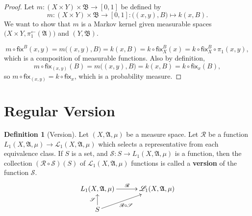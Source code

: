 \documentclass[
twoside=true,
paper=letter,
fontsize=11pt,
pagesize=auto,
leqno,
openany,
headsepline,
overfullrule,
]{scrbook}
\theoremstyle{plain}
\theoremstyle{plain}
\theoremstyle{definition}
\theoremstyle{bfnoteitalic}
\theoremstyle{bfnoteroman}
\newtheorem{defnboldnote}[thm]{Definition}
\newcommand{\term}[1]{\textbf{#1}\index{#1}}
\newcommand{\sigalg}[1]{\mathfrak{#1}}
\newcommand{\cali}[1]{\mathscr{#1}}
\newcommand{\sfop}[1]{\mathsf{#1}}
\newcommand{\preimage}[1]{#1^{\leftarrow}}
\newcommand{\sigmaalgebra}{\sigalg{A}}
\newcommand{\sigmaalgebraii}{\sigalg{B}}
\newcommand{\Lone}{L_1(\measurespace, \sigmaalgebra, \measure)}
\newcommand{\caliLone}{\cali{L}_1(\measurespace, \sigmaalgebra, \measure)}
\newcommand{\measurespace}{X}
\newcommand{\measurespaceii}{Y}
\newcommand{\mspaceelt}{x}
\newcommand{\mspaceeltii}{y}
\newcommand{\measure}{\mu}
\newcommand{\setii}{B}
\newcommand{\regular}{\cali{R}}
\newcommand{\selection}{\cali{S}}
\newcommand{\projectionone}{\pi_1}
\newcommand{\markovkernel}{k}
\newcommand{\markovkernelii}{m}
\newcommand{\fixinthefirst}[1]{\sfop{fix}_{#1}}
\newcommand{\fixinthesecond}[1]{\sfop{fix}^{#1}}
\begin{document}
\begin{proof}
Let
$\markovkernelii:
(\measurespace\times\measurespaceii) \times \sigmaalgebraii 
\to
[0,1]$
be defined by
\[
\markovkernelii:
(\measurespace\times\measurespaceii) \times \sigmaalgebraii 
\to
[0,1]
: 
\bigl((\mspaceelt,\mspaceeltii),\setii\bigr)\mapsto 
\markovkernel(\mspaceelt,\setii).
\]
We want to show that 
$\markovkernelii$ is a Markov kernel given measurable spaces
$\bigl(\measurespace\times\measurespaceii, \preimage\projectionone(\sigmaalgebra)\bigr)$
and
$(\measurespaceii, \sigmaalgebraii)$.

\[
\markovkernelii\circ
\fixinthesecond{\setii}(\mspaceelt,\mspaceeltii)
=
\markovkernelii\bigl((\mspaceelt,\mspaceeltii),\setii\bigr)
=
\markovkernel(\mspaceelt,\setii)
=
\markovkernel\circ\fixinthesecond{\setii}_\measurespace(\mspaceelt)
=
\markovkernel\circ\fixinthesecond{\setii}_\measurespace\circ\projectionone(\mspaceelt,\mspaceeltii),
\]
which is a composition of measurable functions.
Also by definition,
\[
\markovkernelii\circ\fixinthefirst{(\mspaceelt,\mspaceeltii)}(\setii)
=
\markovkernelii\bigl((\mspaceelt,\mspaceeltii),\setii\bigr)
=
\markovkernel(\mspaceelt,\setii)
=
\markovkernel\circ\fixinthefirst{\mspaceelt}(\setii),
\]
so
$\markovkernelii\circ\fixinthefirst{(\mspaceelt,\mspaceeltii)}
=
\markovkernel\circ\fixinthefirst{\mspaceelt}$, which is a probability measure.
\end{proof}




\section{Regular Version}
\begin{defnboldnote}[Version]\label{version}
Let $(\measurespace,\sigmaalgebra,\measure)$ be a measure space.
Let 
$\regular$ be a function $\Lone\to\caliLone$ which selects a representative from each equivalence class.  
If $S$ is a set, and $\selection: S \to \Lone$ is a function, then
the collection $(\regular\circ\selection)(S)$ of 
$\caliLone$ functions is called a \term{version} of the function $\selection$.
\[
\xymatrix@R=16pt@C=30pt{ 
\Lone \ar[r]^{\regular} & \caliLone \\
S \ar[ur]_-{\ \regular\circ\selection} \ar[u]^{\selection} & \\
}
\]
\end{defnboldnote}
\end{document}
